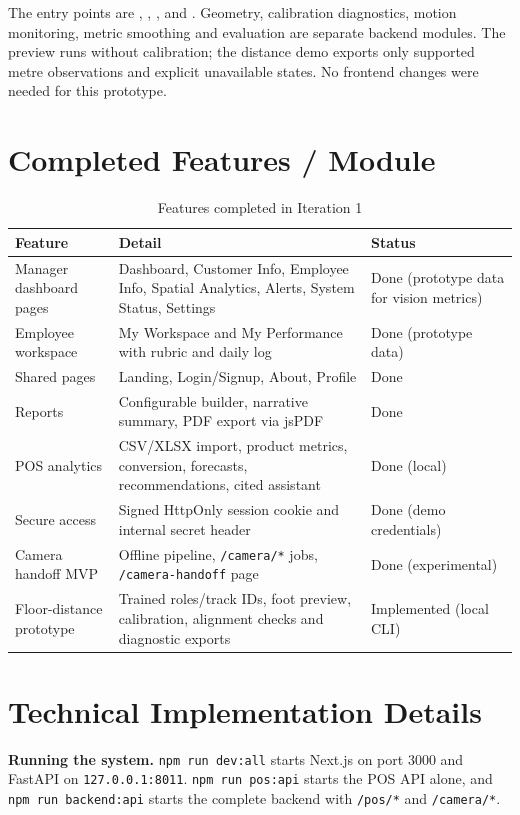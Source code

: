 The entry points are , , , and . Geometry, calibration diagnostics, motion monitoring, metric smoothing and evaluation are separate backend modules. The preview runs without calibration; the distance demo exports only supported metre observations and explicit unavailable states. No frontend changes were needed for this prototype.

\section{Completed Features / Module}
\begin{table}[H]
\centering
\caption{Features completed in Iteration 1}
\begin{tabular}{P{0.3\textwidth}P{0.4\textwidth}P{0.17\textwidth}}
\toprule
Feature & Detail & Status\\
\midrule
Manager dashboard pages & Dashboard, Customer Info, Employee Info, Spatial Analytics, Alerts, System Status, Settings & Done (prototype data for vision metrics)\\
Employee workspace & My Workspace and My Performance with rubric and daily log & Done (prototype data)\\
Shared pages & Landing, Login/Signup, About, Profile & Done\\
Reports & Configurable builder, narrative summary, PDF export via jsPDF & Done\\
POS analytics & CSV/XLSX import, product metrics, conversion, forecasts, recommendations, cited assistant & Done (local)\\
Secure access & Signed HttpOnly session cookie and internal secret header & Done (demo credentials)\\
Camera handoff MVP & Offline pipeline, \texttt{/camera/*} jobs, \texttt{/camera-handoff} page & Done (experimental)\\
Floor-distance prototype & Trained roles/track IDs, foot preview, calibration, alignment checks and diagnostic exports & Implemented (local CLI)\\
\bottomrule
\end{tabular}
\end{table}

\section{Technical Implementation Details}
\textbf{Running the system.} \texttt{npm run dev:all} starts Next.js on port 3000 and FastAPI on \texttt{127.0.0.1:8011}. \texttt{npm run pos:api} starts the POS API alone, and \texttt{npm run backend:api} starts the complete backend with \texttt{/pos/*} and \texttt{/camera/*}.

